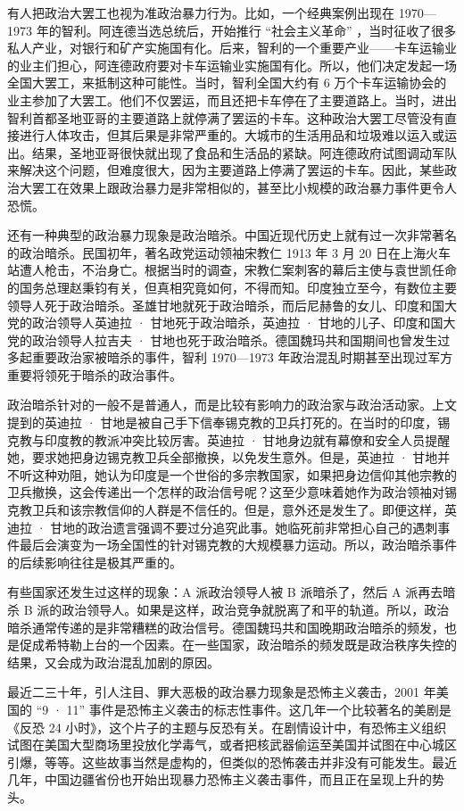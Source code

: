 有人把政治大罢工也视为准政治暴力行为。比如，一个经典案例出现在 1970—1973 年的智利。阿连德当选总统后，开始推行 “社会主义革命” ，当时征收了很多私人产业，对银行和矿产实施国有化。后来，智利的一个重要产业——卡车运输业的业主们担心，阿连德政府要对卡车运输业实施国有化。所以，他们决定发起一场全国大罢工，来抵制这种可能性。当时，智利全国大约有 6 万个卡车运输协会的业主参加了大罢工。他们不仅罢运，而且还把卡车停在了主要道路上。当时，进出智利首都圣地亚哥的主要道路上就停满了罢运的卡车。这种政治大罢工尽管没有直接进行人体攻击，但其后果是非常严重的。大城市的生活用品和垃圾难以运入或运出。结果，圣地亚哥很快就出现了食品和生活品的紧缺。阿连德政府试图调动军队来解决这个问题，但难度很大，因为主要道路上停满了罢运的卡车。因此，某些政治大罢工在效果上跟政治暴力是非常相似的，甚至比小规模的政治暴力事件更令人恐慌。

还有一种典型的政治暴力现象是政治暗杀。中国近现代历史上就有过一次非常著名的政治暗杀。民国初年，著名政党运动领袖宋教仁 1913 年 3 月 20 日在上海火车站遭人枪击，不治身亡。根据当时的调查，宋教仁案刺客的幕后主使与袁世凯任命的国务总理赵秉钧有关，但真相究竟如何，不得而知。印度独立至今，有数位主要领导人死于政治暗杀。圣雄甘地就死于政治暗杀，而后尼赫鲁的女儿、印度和国大党的政治领导人英迪拉 · 甘地死于政治暗杀，英迪拉 · 甘地的儿子、印度和国大党的政治领导人拉吉夫 · 甘地也死于政治暗杀。德国魏玛共和国期间也曾发生过多起重要政治家被暗杀的事件，智利 1970—1973 年政治混乱时期甚至出现过军方重要将领死于暗杀的政治事件。

政治暗杀针对的一般不是普通人，而是比较有影响力的政治家与政治活动家。上文提到的英迪拉 · 甘地是被自己手下信奉锡克教的卫兵打死的。在当时的印度，锡克教与印度教的教派冲突比较厉害。英迪拉 · 甘地身边就有幕僚和安全人员提醒她，要求她把身边锡克教卫兵全部撤换，以免发生意外。但是，英迪拉 · 甘地并不听这种劝阻，她认为印度是一个世俗的多宗教国家，如果把身边信仰其他宗教的卫兵撤换，这会传递出一个怎样的政治信号呢？这至少意味着她作为政治领袖对锡克教卫兵和该宗教信仰的人群是不信任的。但是，意外还是发生了。即便这样，英迪拉 · 甘地的政治遗言强调不要过分追究此事。她临死前非常担心自己的遇刺事件最后会演变为一场全国性的针对锡克教的大规模暴力运动。所以，政治暗杀事件的后续影响往往是极其严重的。

有些国家还发生过这样的现象：A 派政治领导人被 B 派暗杀了，然后 A 派再去暗杀 B 派的政治领导人。如果是这样，政治竞争就脱离了和平的轨道。所以，政治暗杀通常传递的是非常糟糕的政治信号。德国魏玛共和国晚期政治暗杀的频发，也是促成希特勒上台的一个因素。在一些国家，政治暗杀的频发既是政治秩序失控的结果，又会成为政治混乱加剧的原因。

最近二三十年，引人注目、罪大恶极的政治暴力现象是恐怖主义袭击，2001 年美国的 “9 · 11” 事件是恐怖主义袭击的标志性事件。这几年一个比较著名的美剧是《反恐 24 小时》，这个片子的主题与反恐有关。在剧情设计中，有恐怖主义组织试图在美国大型商场里投放化学毒气，或者把核武器偷运至美国并试图在中心城区引爆，等等。这些故事当然是虚构的，但类似的恐怖袭击并非没有可能发生。最近几年，中国边疆省份也开始出现暴力恐怖主义袭击事件，而且正在呈现上升的势头。

